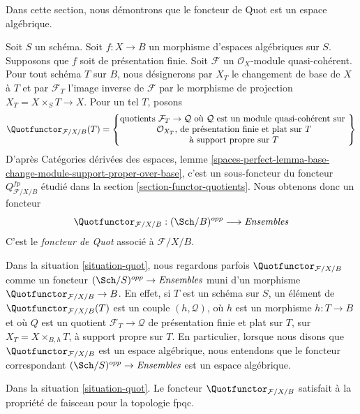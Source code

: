 \noindent
Dans cette section, nous démontrons que le foncteur de Quot est un espace
algébrique.

\begin{situation}
\label{situation-quot}
Soit $S$ un schéma. Soit $f : X \to B$ un morphisme d'espaces algébriques sur
$S$. Supposons que $f$ soit de présentation finie. Soit $\mathcal{F}$ un
$\mathcal{O}_X$-module quasi-cohérent. Pour tout schéma $T$ sur $B$, nous
désignerons par $X_T$ le changement de base de $X$ à $T$ et par
$\mathcal{F}_T$ l'image inverse de $\mathcal{F}$ par le morphisme de
projection $X_T = X \times_S T \to X$. Pour un tel $T$, posons
$$
\Quotfunctor_{\mathcal{F}/X/B}(T) =
\left\{
\begin{matrix}
\text{quotients }\mathcal{F}_T \to \mathcal{Q}\text{ où }
\mathcal{Q}\text{ est un module quasi-cohérent sur }\\
\mathcal{O}_{X_T}\text{, de présentation finie et plat sur }T\\
\text{à support propre sur }T
\end{matrix}
\right\}
$$
D'après Catégories dérivées des espaces, lemme
\ref{spaces-perfect-lemma-base-change-module-support-proper-over-base}, c'est
un sous-foncteur du foncteur $Q^{fp}_{\mathcal{F}/X/B}$ étudié dans la section
\ref{section-functor-quotients}. Nous obtenons donc un foncteur
\begin{equation}
\label{equation-quot}
\Quotfunctor_{\mathcal{F}/X/B} : (\Sch/B)^{opp} \longrightarrow \textit{Ensembles}
\end{equation}
C'est le {\it foncteur de Quot} associé à $\mathcal{F}/X/B$.
\end{situation}

\noindent
Dans la situation \ref{situation-quot}, nous regardons parfois
$\Quotfunctor_{\mathcal{F}/X/B}$ comme un foncteur
$(\Sch/S)^{opp} \to \textit{Ensembles}$ muni d'un morphisme
$\Quotfunctor_{\mathcal{F}/X/B} \to B$. En effet, si $T$ est un schéma sur
$S$, un élément de $\Quotfunctor_{\mathcal{F}/X/B}(T)$ est un couple
$(h, \mathcal{Q})$, où $h$ est un morphisme $h : T \to B$ et où $Q$ est un
quotient $\mathcal{F}_T \to \mathcal{Q}$ de présentation finie et plat sur
$T$, sur $X_T = X \times_{B, h} T$, à support propre sur $T$. En particulier,
lorsque nous disons que $\Quotfunctor_{\mathcal{F}/X/B}$ est un espace
algébrique, nous entendons que le foncteur correspondant
$(\Sch/S)^{opp} \to \textit{Ensembles}$ est un espace algébrique.

\begin{lemma}
\label{lemma-quot-sheaf}
Dans la situation \ref{situation-quot}. Le foncteur
$\Quotfunctor_{\mathcal{F}/X/B}$ satisfait à la propriété de faisceau pour la
topologie fpqc.
\end{lemma}

